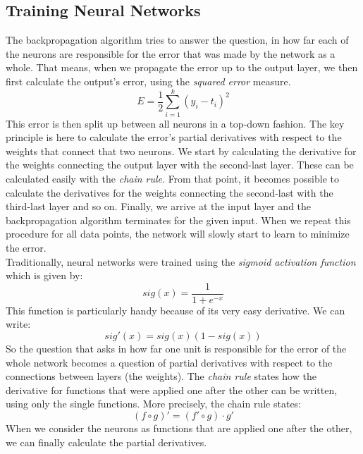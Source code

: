 \documentclass[11pt,a4paper]{article}
\begin{document}
\subsection{Training Neural Networks}
The backpropagation algorithm tries to answer the question, in how far each of the neurons are responsible for the error that was made by the network as a whole. That means, when we propagate the error up to the output layer, we then first calculate the output's error, using the \textit{squared error} measure.
\begin{equation*}
E = \frac{1}{2} \sum_{i=1}^k (y_i - t_i)^2
\end{equation*}
This error is then split up between all neurons in a top-down fashion. The key principle is here to calculate the error's partial derivatives with respect to the weights that connect that two neurons. We start by calculating the derivative for the weights connecting the output layer with the second-last layer. These can be calculated easily with the \textit{chain rule}. From that point, it becomes possible to calculate the derivatives for the weights connecting the second-last with the third-last layer and so on. Finally, we arrive at the input layer and the backpropagation algorithm terminates for the given input. When we repeat this procedure for all data points, the network will slowly start to learn to minimize the error.\\
Traditionally, neural networks were trained using the \textit{sigmoid activation function} which is given by:
\begin{equation*}
sig(x) = \frac{1}{1 + e^{-x}}
\end{equation*}
This function is particularly handy because of its very easy derivative. We can write:
\begin{equation*}
sig'(x) = sig(x) (1-sig(x))
\end{equation*}
So the question that asks in how far one unit is responsible for the error of the whole network becomes a question of partial derivatives with respect to the connections between layers (the weights). The \textit{chain rule} states how the derivative for functions that were applied one after the other can be written, using only the single functions. More precisely, the chain rule states:
\begin{equation} \label{eq:chainrule}
(f \circ g)' = (f' \circ g) \cdot g'
\end{equation}
When we consider the neurons as functions that are applied one after the other, we can finally calculate the partial derivatives.\\
\end{document}
